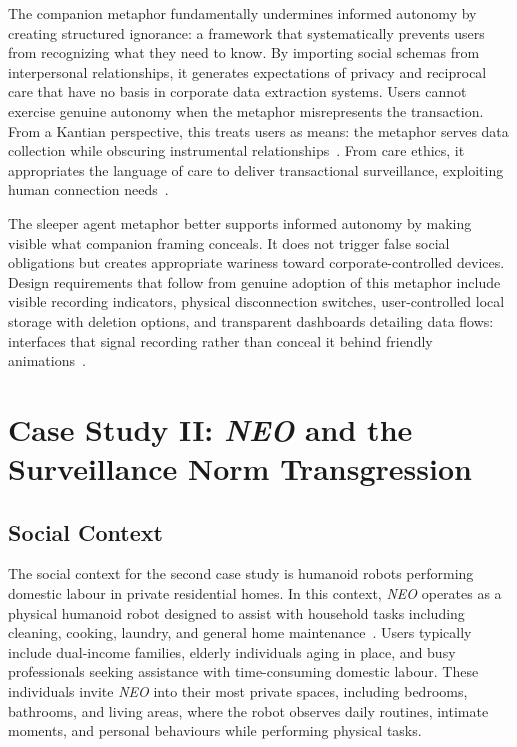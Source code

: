 \documentclass{ieee-portfolio}
\newcommand{\neo}{\textit{NEO}}
\begin{document}
The companion metaphor fundamentally undermines informed autonomy by creating structured ignorance: a framework that systematically prevents users from recognizing what they need to know. By importing social schemas from interpersonal relationships, it generates expectations of privacy and reciprocal care that have no basis in corporate data extraction systems. Users cannot exercise genuine autonomy when the metaphor misrepresents the transaction. From a Kantian perspective, this treats users as means: the metaphor serves data collection while obscuring instrumental relationships~\cite{fjeld_principled_2020}. From care ethics, it appropriates the language of care to deliver transactional surveillance, exploiting human connection needs~\cite{noddings_caring_1986}.

The sleeper agent metaphor better supports informed autonomy by making visible what companion framing conceals. It does not trigger false social obligations but creates appropriate wariness toward corporate-controlled devices. Design requirements that follow from genuine adoption of this metaphor include visible recording indicators, physical disconnection switches, user-controlled local storage with deletion options, and transparent dashboards detailing data flows: interfaces that signal recording rather than conceal it behind friendly animations~\cite{gray_dark_2018}.

\section{Case Study II: \neo{} and the Surveillance Norm Transgression}
\label{sec:neo}

\subsection{Social Context}

The social context for the second case study is humanoid robots performing domestic labour in private residential homes. In this context, \neo{} operates as a physical humanoid robot designed to assist with household tasks including cleaning, cooking, laundry, and general home maintenance~\cite{bornich_meet_2025}. Users typically include dual-income families, elderly individuals aging in place, and busy professionals seeking assistance with time-consuming domestic labour. These individuals invite \neo{} into their most private spaces, including bedrooms, bathrooms, and living areas, where the robot observes daily routines, intimate moments, and personal behaviours while performing physical tasks.
\end{document}
